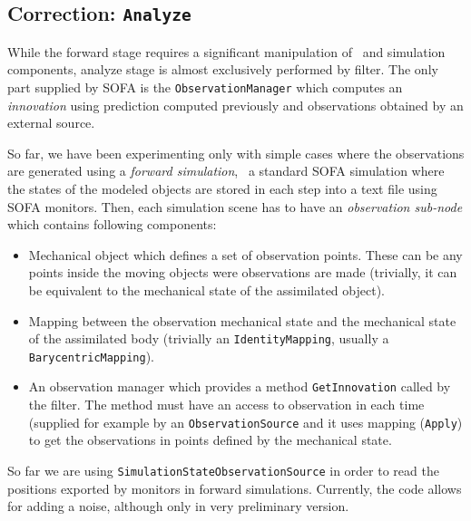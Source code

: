 \documentclass[10pt]{article}
\begin{document}
\subsection{Correction: \texttt{Analyze}}
While the forward stage requires a significant manipulation of \sstate\ and simulation components, analyze stage is almost exclusively performed by filter. The only part supplied by SOFA is the \texttt{ObservationManager} which computes an \emph{innovation} using prediction computed previously and observations obtained by an external source.

So far, we have been experimenting only with simple cases where the observations are generated using a \emph{forward simulation}, \ie\ a standard SOFA simulation where the states of the modeled objects are stored in each step into a text file using SOFA monitors. Then, each simulation scene has to have an \emph{observation sub-node} which contains following components:
\begin{itemize}
\item Mechanical object which defines a set of observation points. These can be any points inside the moving objects were observations are made (trivially, it can be equivalent to the mechanical 
state of the assimilated object).
\item Mapping between the observation mechanical state and the mechanical state of the assimilated body (trivially an \texttt{IdentityMapping}, usually a \texttt{BarycentricMapping}).
\item An observation manager which provides a method \texttt{GetInnovation} called by the filter. The method must have an access to observation in each time (supplied for example by an \texttt{ObservationSource} and it uses mapping (\texttt{Apply}) to get the observations in points
defined by the mechanical state. 
\end{itemize}

So far we are using \texttt{SimulationStateObservationSource} in order to read the positions exported by monitors in forward simulations. Currently, the code allows for adding a noise, although only in very preliminary version.
\end{document}
